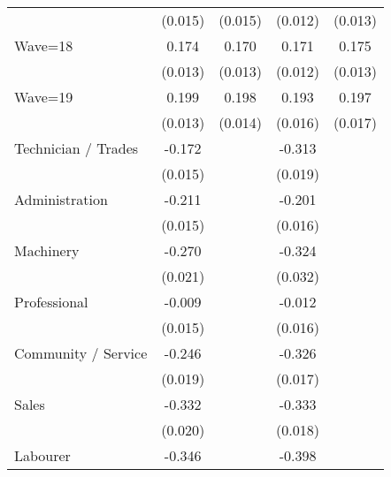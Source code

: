 {\begin{tabular}{l*{4}{c}}
                    &     (0.015)         &     (0.015)         &     (0.012)         &     (0.013)         \\
Wave=18             &       0.174\sym{***}&       0.170\sym{***}&       0.171\sym{***}&       0.175\sym{***}\\
                    &     (0.013)         &     (0.013)         &     (0.012)         &     (0.013)         \\
Wave=19             &       0.199\sym{***}&       0.198\sym{***}&       0.193\sym{***}&       0.197\sym{***}\\
                    &     (0.013)         &     (0.014)         &     (0.016)         &     (0.017)         \\
Technician / Trades &      -0.172\sym{***}&                     &      -0.313\sym{***}&                     \\
                    &     (0.015)         &                     &     (0.019)         &                     \\
Administration      &      -0.211\sym{***}&                     &      -0.201\sym{***}&                     \\
                    &     (0.015)         &                     &     (0.016)         &                     \\
Machinery           &      -0.270\sym{***}&                     &      -0.324\sym{***}&                     \\
                    &     (0.021)         &                     &     (0.032)         &                     \\
Professional        &      -0.009         &                     &      -0.012         &                     \\
                    &     (0.015)         &                     &     (0.016)         &                     \\
Community / Service &      -0.246\sym{***}&                     &      -0.326\sym{***}&                     \\
                    &     (0.019)         &                     &     (0.017)         &                     \\
Sales               &      -0.332\sym{***}&                     &      -0.333\sym{***}&                     \\
                    &     (0.020)         &                     &     (0.018)         &                     \\
Labourer            &      -0.346\sym{***}&                     &      -0.398\sym{***}&                     \\

\end{tabular}}
